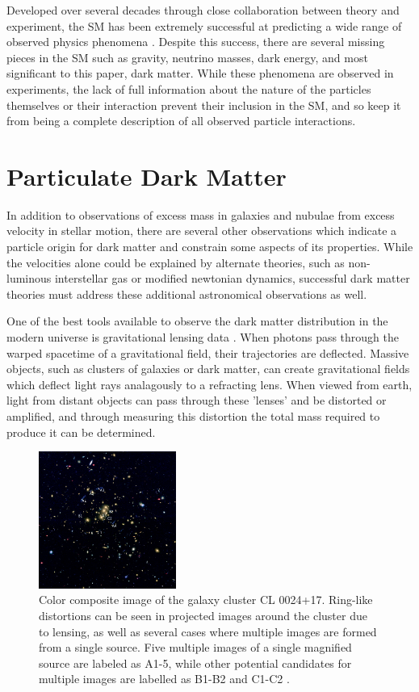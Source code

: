 Developed over several decades through close collaboration between theory and experiment, the SM has been extremely successful at predicting a wide range of observed physics phenomena .
Despite this success, there are several missing pieces in the SM such as gravity, neutrino masses, dark energy, and most significant to this paper, dark matter.
While these phenomena are observed in experiments, the lack of full information about the nature of the particles themselves or their interaction prevent their inclusion in the SM, and so keep it from being a complete description of all observed particle interactions.  

\section{Particulate Dark Matter}

In addition to observations of excess mass in galaxies and nubulae from excess velocity in stellar motion, there are several other observations which indicate a particle origin for dark matter and constrain some aspects of its properties. 
While the velocities alone could be explained by alternate theories, such as non-luminous interstellar gas or modified newtonian dynamics, successful dark matter theories must address these additional astronomical observations as well. 

One of the best tools available to observe the dark matter distribution in the modern universe is gravitational lensing data \cite{Massey_2010}.
When photons pass through the warped spacetime of a gravitational field, their trajectories are deflected.
Massive objects, such as clusters of galaxies or dark matter, can create gravitational fields which deflect light rays analagously to a refracting lens.
When viewed from earth, light from distant objects can pass through these 'lenses' and be distorted or amplified, and through measuring this distortion the total mass required to produce it can be determined.

\begin{figure}
	\label{fig:gravLensing}
	\centering
	\includegraphics[width=0.4\textwidth]{figures/grav_lensing.jpg}
	\caption[Gravitational lensing of galaxy cluster CL0024+17]{ Color composite image of the galaxy cluster CL 0024+17. Ring-like distortions can be seen in projected images around the cluster due to lensing, as well as several cases where multiple images are formed from a single source. Five multiple images of a single magnified source are labeled as A1-5, while other potential candidates for multiple images are labelled as B1-B2 and C1-C2 \cite{jee2007}.}
\end{figure}

